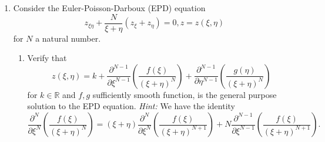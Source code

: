 \documentclass[a4paper,12pt]{article}
\newcommand{\reals}{\mathbb{R}}
\begin{document}
\begin{enumerate}[label = \arabic*.]
	\newpage
	\item Consider the Euler-Poisson-Darboux (EPD) equation
	\[
		z_{\xi \eta} + \frac{N}{\xi + \eta} (z_\xi + z_\eta) = 0, z = z(\xi, \eta)
	\]	
	for $ N $ a natural number.
	\begin{enumerate}[label = (\alph*)]
		\item Verify that
		\[
			z(\xi, \eta) = k + \frac{\partial^{N - 1}}{\partial \xi^{N - 1}} \left(\frac{f(\xi)}{(\xi + \eta)^N}\right) + \frac{\partial^{N - 1}}{\partial \eta^{N - 1}} \left(\frac{g(\eta)}{(\xi + \eta)^N}\right)
		\]
		for $ k \in \reals $ and $ f,g $ sufficiently smooth function, is the general purpose solution to the EPD equation. \textit{Hint:} We have the identity
		\[
			\frac{\partial^{N}}{\partial \xi^{N}} \left(\frac{f(\xi)}{(\xi + \eta)^N}\right) = (\xi + \eta)\frac{\partial^{N}}{\partial \xi^{N}} \left(\frac{f(\xi)}{(\xi + \eta)^{N + 1}}\right) + N\frac{\partial^{N - 1}}{\partial \xi^{N - 1}} \left(\frac{f(\xi)}{(\xi + \eta)^{N + 1}}\right).
		\]
		

\end{enumerate}
\end{enumerate}
\end{document}
